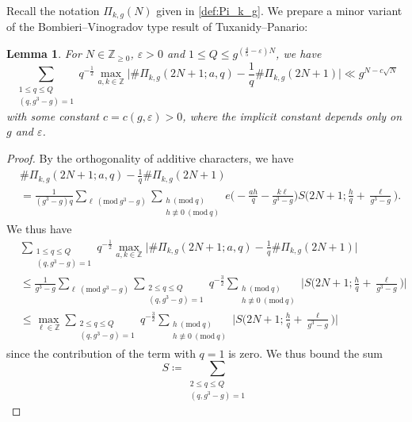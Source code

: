 \documentclass{amsart}
\theoremstyle{plain}
\newtheorem{lemma}[theorem]{Lemma}
\theoremstyle{definition}
\let\tmp\phi
\let\phi\varphi
\let\varphi\tmp
\let\tmp\epsilon
\let\epsilon\varepsilon
\let\varepsilon\tmp
\renewcommand{\mod}[1]{(\mathrm{mod}\ #1)}
\begin{document}
Recall the notation $\Pi_{k,g}(N)$ given in \cref{def:Pi_k_g}.
We prepare a minor variant of the Bombieri--Vinogradov type result of Tuxanidy--Panario:
\begin{lemma}
\label{lem:Tuxanidy_Panario_BV_variant}
For $N\in\mathbb{Z}_{\ge0}$, $\epsilon>0$ and $1\le Q\le g^{(\frac{4}{5}-\epsilon)N}$, we have
\[
\sum_{\substack{
1\le q\le Q\\
(q,g^{3}-g)=1
}}
q^{-\frac{1}{2}}
\max_{a,k\in\mathbb{Z}}
\biggl|
\#\Pi_{k,g}(2N+1;a,q)
-
\frac{1}{q}\#\Pi_{k,g}(2N+1)
\biggr|
\ll
g^{N-c\sqrt{N}}
\]
with some constant $c=c(g,\epsilon)>0$,
where the implicit constant depends only on $g$ and $\epsilon$.
\end{lemma}
\begin{proof}
By the orthogonality of additive characters, we have
\begin{align}
&\#\Pi_{k,g}(2N+1;a,q)
-
\frac{1}{q}\#\Pi_{k,g}(2N+1)\\
&=
\frac{1}{(g^{3}-g)q}
\sum_{\ell\ \mod{g^{3}-g}}
\sum_{\substack{
h\ \mod{q}\\
h\not\equiv0\ \mod{q}
}}
e\biggl(-\frac{ah}{q}-\frac{k\ell}{g^{3}-g}\biggr)
S\biggl(2N+1;\frac{h}{q}+\frac{\ell}{g^{3}-g}\biggr).
\end{align}
We thus have
\begin{align}
&\sum_{\substack{
1\le q\le Q\\
(q,g^{3}-g)=1
}}
q^{-\frac{1}{2}}
\max_{a,k\in\mathbb{Z}}
\biggl|
\#\Pi_{k,g}(2N+1;a,q)
-
\frac{1}{q}\#\Pi_{k,g}(2N+1)
\biggr|\\
&\le
\frac{1}{g^{3}-g}
\sum_{\ell\ \mod{g^{3}-g}}
\sum_{\substack{
2\le q\le Q\\
(q,g^{3}-g)=1
}}
q^{-\frac{3}{2}}
\sum_{\substack{
h\ \mod{q}\\
h\not\equiv0\ \mod{q}
}}
\biggl|S\biggl(2N+1;\frac{h}{q}+\frac{\ell}{g^{3}-g}\biggr)\biggr|\\
&\le
\max_{\ell\in\mathbb{Z}}
\sum_{\substack{
2\le q\le Q\\
(q,g^{3}-g)=1
}}
q^{-\frac{3}{2}}
\sum_{\substack{
h\ \mod{q}\\
h\not\equiv0\ \mod{q}
}}
\biggl|S\biggl(2N+1;\frac{h}{q}+\frac{\ell}{g^{3}-g}\biggr)\biggr|
\end{align}
since the contribution of the term with $q=1$ is zero.
We thus bound the sum
\[
S
\coloneqq
\sum_{\substack{
2\le q\le Q\\
(q,g^{3}-g)=1
}}
\]
\end{proof}
\end{document}
